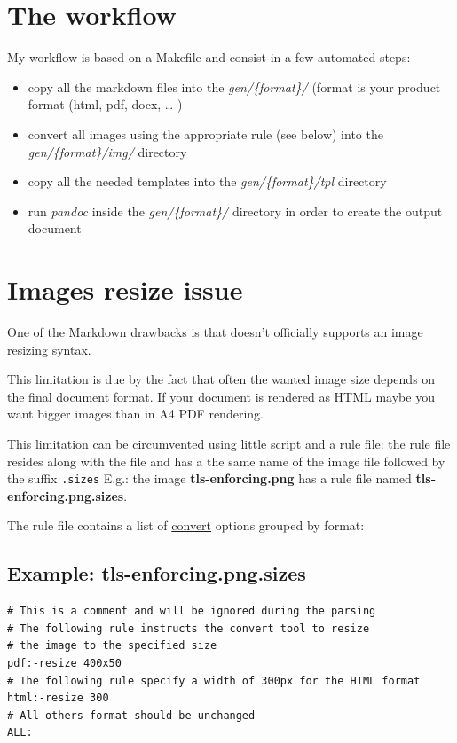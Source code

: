 \documentclass[	DIV=calc,%
							paper=a4,%
							fontsize=10pt]{scrartcl}	 					%
\begin{document}
\section{The workflow}\label{the-workflow}

My workflow is based on a Makefile and consist in a few automated steps:

\begin{itemize}
\itemsep1pt\parskip0pt
\item
  copy all the markdown files into the \emph{gen/\{format\}/} (format is
  your product format (html, pdf, docx, \ldots{} )
\item
  convert all images using the appropriate rule (see below) into the
  \emph{gen/\{format\}/img/} directory
\item
  copy all the needed templates into the \emph{gen/\{format\}/tpl}
  directory
\item
  run \emph{pandoc} inside the \emph{gen/\{format\}/} directory in order
  to create the output document
\end{itemize}

\section{Images resize issue}\label{images-resize-issue}

One of the Markdown drawbacks is that doesn't officially supports an
image resizing syntax.

This limitation is due by the fact that often the wanted image size
depends on the final document format. If your document is rendered as
HTML maybe you want bigger images than in A4 PDF rendering.

This limitation can be circumvented using little script and a rule file:
the rule file resides along with the file and has a the same name of the
image file followed by the suffix \texttt{.sizes} E.g.: the image
\textbf{tls-enforcing.png} has a rule file named
\textbf{tls-enforcing.png.sizes}.

The rule file contains a list of
\href{http://www.imagemagick.org/script/convert.php}{convert} options
grouped by format:

\subsection{Example:
\textbf{tls-enforcing.png.sizes}}\label{example-tls-enforcing.png.sizes}

\begin{verbatim}
# This is a comment and will be ignored during the parsing
# The following rule instructs the convert tool to resize 
# the image to the specified size
pdf:-resize 400x50
# The following rule specify a width of 300px for the HTML format
html:-resize 300
# All others format should be unchanged
ALL:
\end{verbatim}
\end{document}

